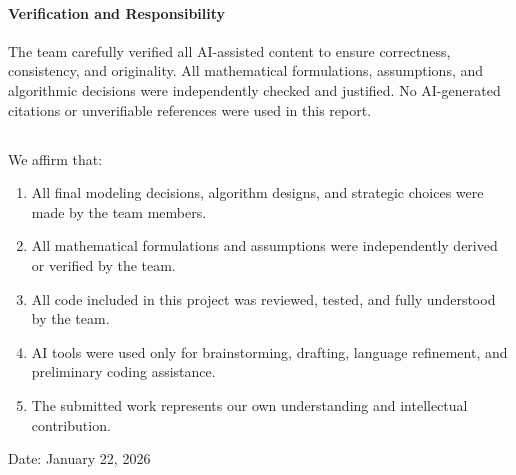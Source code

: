 \paragraph{Verification and Responsibility}
The team carefully verified all AI-assisted content to ensure correctness, consistency, and originality.
All mathematical formulations, assumptions, and algorithmic decisions were independently checked and justified.
No AI-generated citations or unverifiable references were used in this report.

\subsection*{}
We affirm that:
\begin{enumerate}
  \item All final modeling decisions, algorithm designs, and strategic choices were made by the team members.
  \item All mathematical formulations and assumptions were independently derived or verified by the team.
  \item All code included in this project was reviewed, tested, and fully understood by the team.
  \item AI tools were used only for brainstorming, drafting, language refinement, and preliminary coding assistance.
  \item The submitted work represents our own understanding and intellectual contribution.
\end{enumerate}
\begin{flushright}
Date: January 22, 2026
\end{flushright}
\normalsize
\endgroup
